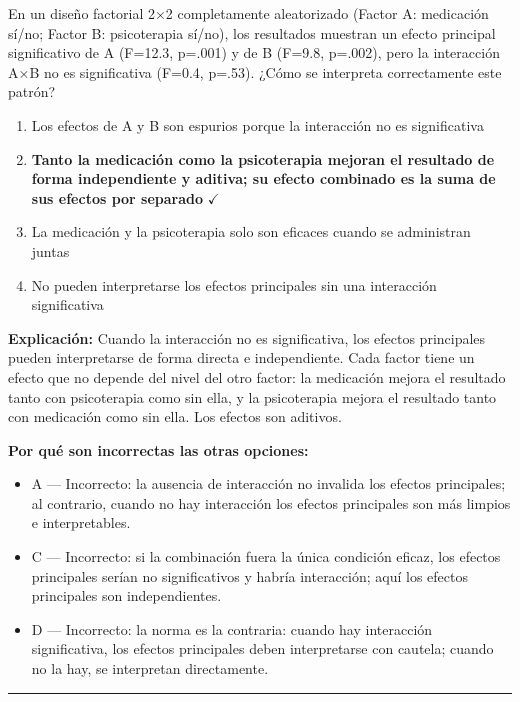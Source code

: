 \documentclass[12pt,a4paper]{article}
\begin{document}
En un diseño factorial 2×2 completamente aleatorizado (Factor A: medicación sí/no; Factor B: psicoterapia sí/no), los resultados muestran un efecto principal significativo de A (F=12.3, p=.001) y de B (F=9.8, p=.002), pero la interacción A×B no es significativa (F=0.4, p=.53). ¿Cómo se interpreta correctamente este patrón?

\begin{enumerate}
  \item[A.] Los efectos de A y B son espurios porque la interacción no es significativa
  \item[\textbf{\color{verde}B.}] \textbf{\color{verde} Tanto la medicación como la psicoterapia mejoran el resultado de forma independiente y aditiva; su efecto combinado es la suma de sus efectos por separado} \hfill $\checkmark$
  \item[C.] La medicación y la psicoterapia solo son eficaces cuando se administran juntas
  \item[D.] No pueden interpretarse los efectos principales sin una interacción significativa
\end{enumerate}

\noindent\textbf{\color{azul}Explicación:} Cuando la interacción no es significativa, los efectos principales pueden interpretarse de forma directa e independiente. Cada factor tiene un efecto que no depende del nivel del otro factor: la medicación mejora el resultado tanto con psicoterapia como sin ella, y la psicoterapia mejora el resultado tanto con medicación como sin ella. Los efectos son aditivos.

\noindent\textbf{\color{gris}Por qué son incorrectas las otras opciones:}
\begin{itemize}
  \item {\small A — Incorrecto: la ausencia de interacción no invalida los efectos principales; al contrario, cuando no hay interacción los efectos principales son más limpios e interpretables.}
  \item {\small C — Incorrecto: si la combinación fuera la única condición eficaz, los efectos principales serían no significativos y habría interacción; aquí los efectos principales son independientes.}
  \item {\small D — Incorrecto: la norma es la contraria: cuando hay interacción significativa, los efectos principales deben interpretarse con cautela; cuando no la hay, se interpretan directamente.}
\end{itemize}
\vspace{8pt}\hrule\vspace{10pt}
\end{document}
